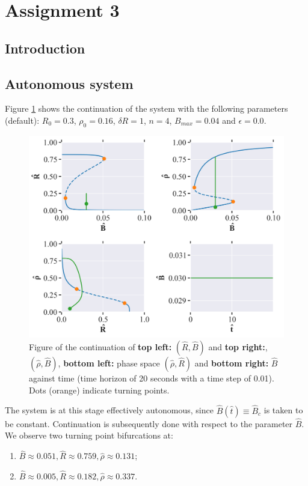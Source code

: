 \section{Assignment 3}

\subsection{Introduction}

\subsection{Autonomous system}
Figure \ref{fig:cell_biology_ex1} shows the continuation of the system with the following parameters (default): $R_0 = 0.3$, $\rho_0 = 0.16$, $\delta R = 1$, $n = 4$, $B_{max} = 0.04$ and $\epsilon = 0.0$. 

\begin{figure}[H]
    \centering
    \includegraphics[width= \textwidth]{figures/cell_biology_R0=0.3_rho0=0.16_deltaR=1_n=4_Bmax=0.04_eps=0.0.png}
    \caption{Figure of the continuation of \textbf{top left:} $(\hat{R}, \hat{B})$ and \textbf{top right:}, $(\hat{\rho}, \hat{B})$, \textbf{bottom left:} phase space $(\hat{\rho}, \hat{R})$ and 
    \textbf{bottom right:} $\hat{B}$ against time (time horizon of 20 seconds with a time step of 0.01). Dots (orange) indicate turning points.}
    \label{fig:cell_biology_ex1}
\end{figure}

The system is at this stage effectively autonomous, since $\hat{B}(\hat{t}) \equiv \hat{B}_c$ is taken to be constant. Continuation is subsequently done with respect to the parameter $\hat{B}$. We observe two turning point bifurcations at:
\begin{enumerate}
    \item $\hat{B} \approx 0.051, \hat{R}\approx0.759, \hat{\rho}\approx0.131$; 
    \item $\hat{B} \approx 0.005, \hat{R}\approx0.182, \hat{\rho}\approx0.337$.
\end{enumerate}

